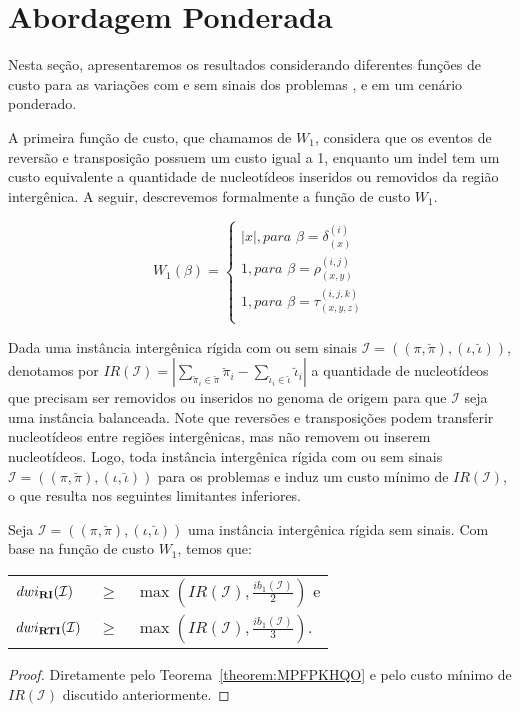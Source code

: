 \pagebreak

\section{Abordagem Ponderada}

Nesta seção, apresentaremos os resultados considerando diferentes funções de custo para as variações com e sem sinais dos problemas \SbWIRI{}, \SbWIRTI{} e \SbWIRT{} em um cenário ponderado.

A primeira função de custo, que chamamos de $W_1$, considera que os eventos de reversão e transposição possuem um custo igual a 1, enquanto um indel tem um custo equivalente a quantidade de nucleotídeos inseridos ou removidos da região intergênica. A seguir, descrevemos formalmente a função de custo $W_1$.

$$
  W_1(\beta) = \begin{cases}
      |x|, \textit{para } \beta = \delta_{(x)}^{(i)} \\
      1, \textit{para } \beta = \rho_{(x,y)}^{(i,j)} \\
      1, \textit{para } \beta = \tau_{(x,y,z)}^{(i,j,k)} \\
  \end{cases}
$$

Dada uma instância intergênica rígida com ou sem sinais $\mathcal{I}=((\pi,\breve\pi),(\iota,\breve\iota))$, denotamos por $IR(\mathcal{I}) = |\sum_{\breve\pi_i \in \breve\pi} \breve\pi_i - \sum_{\breve\iota_i \in \breve\iota} \breve\iota_i|$ a quantidade de nucleotídeos que precisam ser removidos ou inseridos no genoma de origem para que $\mathcal{I}$ seja uma instância balanceada. Note que reversões e transposições podem transferir nucleotídeos entre regiões intergênicas, mas não removem ou inserem nucleotídeos. Logo, toda instância intergênica rígida com ou sem sinais $\mathcal{I}=((\pi,\breve\pi),(\iota,\breve\iota))$ para os problemas \SbWIRI{} e \SbWIRTI{} induz um custo mínimo de $IR(\mathcal{I})$, o que resulta nos seguintes limitantes inferiores.

\begin{theorem}\label{theorem:IQACALLP}
Seja $\mathcal{I} = ((\pi,\breve\pi),(\iota,\breve\iota))$ uma instância intergênica rígida sem sinais. Com base na função de custo $W_1$, temos que:

\begin{tabular}{lll}
  $dwi_{\textbf{RI}}(\mathcal{I})$      & $ \ge $ & $\max(IR(\mathcal{I}),\frac{ib_1(\mathcal{I})}{2})$ e \\ 
  $dwi_{\textbf{RTI}}(\mathcal{I})$     & $ \ge $ & $\max(IR(\mathcal{I}),\frac{ib_1(\mathcal{I})}{3})$.
\end{tabular}
\begin{proof}
Diretamente pelo Teorema~\ref{theorem:MPFPKHQO} e pelo custo mínimo de $IR(\mathcal{I})$ discutido anteriormente.
\end{proof}
\end{theorem}

